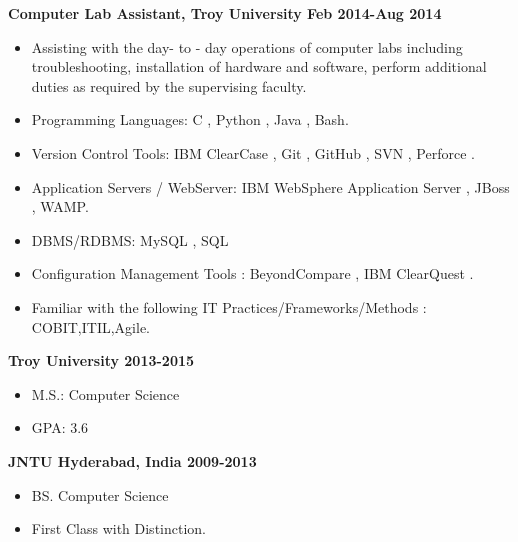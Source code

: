 \documentclass[10.5pt]{article} %
\begin{document}
\smallskip

\noindent \centerline{\large \bf Computer Lab Assistant, Troy University \hfill Feb 2014-Aug 2014}
\begin{itemize}
  \item Assisting with the day- to - day operations of computer labs including troubleshooting, installation of hardware and software, perform additional duties as required by the supervising faculty.
\end{itemize}

\smallskip
\noindent

\noindent %
\begin{itemize}
\item Programming Languages: C , Python , Java , Bash.
\smallskip
\item Version Control Tools: IBM ClearCase , Git , GitHub , SVN , Perforce .
\smallskip
\item Application Servers / WebServer: IBM WebSphere Application Server ,  JBoss , WAMP.
\smallskip
\item DBMS/RDBMS: MySQL ,  SQL
\smallskip
\item Configuration Management Tools : BeyondCompare , IBM ClearQuest . 
\smallskip
\item Familiar with the following IT Practices/Frameworks/Methods : COBIT,ITIL,Agile.
\smallskip
\end{itemize}
\smallskip

\medskip

\noindent \centerline{\large \bf Troy University \hfill 2013-2015}
\begin{itemize}
  \item M.S.: Computer Science 
  \item GPA: 3.6
\end{itemize}

\noindent \centerline{\large \bf JNTU Hyderabad, India \hfill 2009-2013}
\begin{itemize}
  \item BS. Computer Science
  \item First Class with Distinction.
\end{itemize}
\end{document}
